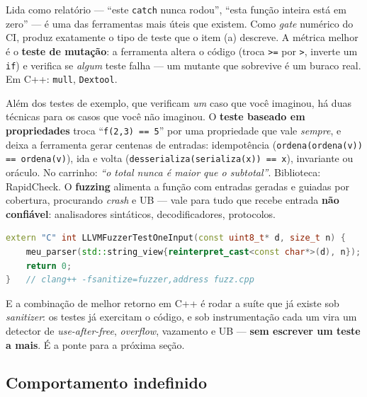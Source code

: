 \begin{regra}
Lida como relatório --- ``este \texttt{catch} nunca rodou'', ``esta função
inteira está em zero'' --- é uma das ferramentas mais úteis que existem. Como
\emph{gate} numérico do CI, produz exatamente o tipo de teste que o item (a)
descreve. A métrica melhor é o \textbf{teste de mutação}: a ferramenta altera o
código (troca \texttt{>=} por \texttt{>}, inverte um \texttt{if}) e verifica se
\emph{algum} teste falha --- um mutante que sobrevive é um buraco real. Em C++:
\texttt{mull}, \texttt{Dextool}.
\end{regra}

Além dos testes de exemplo, que verificam \emph{um} caso que você imaginou, há
duas técnicas para os casos que você não imaginou. O \textbf{teste baseado em
propriedades} troca ``\texttt{f(2,3) == 5}'' por uma propriedade que vale
\emph{sempre}, e deixa a ferramenta gerar centenas de entradas: idempotência
(\texttt{ordena(ordena(v)) == ordena(v)}), ida e volta
(\texttt{desserializa(serializa(x)) == x}), invariante ou oráculo. No carrinho:
\emph{``o total nunca é maior que o subtotal''}. Biblioteca: RapidCheck. O
\textbf{fuzzing} alimenta a função com entradas geradas e guiadas por cobertura,
procurando \emph{crash} e UB --- vale para tudo que recebe entrada \textbf{não
confiável}: analisadores sintáticos, decodificadores, protocolos.

\begin{lstlisting}[style=bt, language=C++,
    caption={O ponto de entrada do libFuzzer.}]
extern "C" int LLVMFuzzerTestOneInput(const uint8_t* d, size_t n) {
    meu_parser(std::string_view{reinterpret_cast<const char*>(d), n});
    return 0;
}   // clang++ -fsanitize=fuzzer,address fuzz.cpp
\end{lstlisting}

E a combinação de melhor retorno em C++ é rodar a suíte que já existe sob
\emph{sanitizer}: os testes já exercitam o código, e sob instrumentação cada um
vira um detector de \emph{use-after-free}, \emph{overflow}, vazamento e UB ---
\textbf{sem escrever um teste a mais}. É a ponte para a próxima seção.

\subsection{Comportamento indefinido}
\label{sec:ub}


